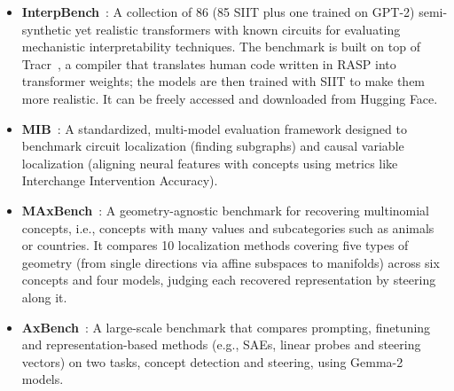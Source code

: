 \documentclass[11pt,a4paper]{article}
\begin{document}
\begin{itemize}
  \item \textbf{InterpBench}~\cite{gupta2024interpbench}: A collection of 86 (85 SIIT plus one trained on GPT-2) semi-synthetic yet realistic transformers
with known circuits for evaluating mechanistic interpretability techniques. The benchmark is built on top of Tracr~\cite{lindner2023tracr}, a compiler that translates human code written in RASP into transformer weights; the models are then trained with SIIT to make them more realistic. It can be freely accessed and downloaded from Hugging Face.

  \item \textbf{MIB}~\cite{mueller2025mib}: A standardized, multi-model evaluation framework designed to benchmark circuit localization (finding subgraphs) and causal variable localization (aligning neural features with concepts using metrics like Interchange Intervention Accuracy).


  \item \textbf{MAxBench}~\cite{appapogu2026maxbench}: A geometry-agnostic benchmark for recovering multinomial concepts, i.e., concepts with many values and subcategories such as animals or countries. It compares 10 localization methods covering five types of geometry (from single directions via affine subspaces to manifolds) across six concepts and four models, judging each recovered representation by steering along it.

  \item \textbf{AxBench}~\cite{wu2025axbench}: A large-scale benchmark that compares prompting, finetuning and representation-based methods (e.g., SAEs, linear probes and steering vectors) on two tasks, concept detection and steering, using Gemma-2 models.


\end{itemize}
\end{document}
